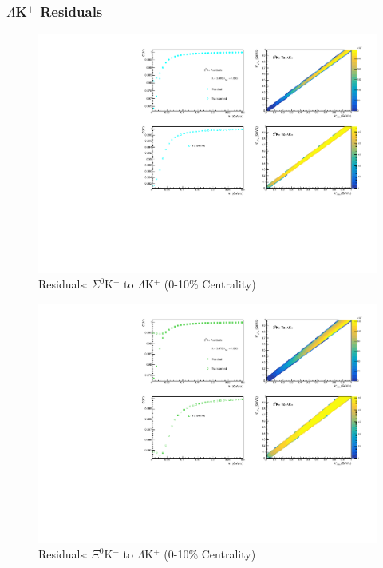 \documentclass[/home/jesse/Analysis/FemtoAnalysis/AnalysisNotes/AnalysisNoteJBuxton.tex]{subfiles}
\begin{document}
\subsubsection{\texorpdfstring{$\Lambda$K$^{+}$}{TEXT} Residuals}
\label{Residuals_LamKchP}

\begin{figure}[h]
  \centering
  \includegraphics[width=\textwidth]{9_AdditionalFigures/Figures/Residuals/LamKchP/Residuals_LamKchP_0010_Sig0KchP_MomResCrctn_NonFlatBgdCrctn_10Res_PrimMaxDecay4fm_UsingXiDataAndCoulombOnly.pdf}
  \caption[Residuals: $\Sigma^{0}$K$^{+}$ to $\Lambda$K$^{+}$ (0-10\% Centrality)]{Residuals: $\Sigma^{0}$K$^{+}$ to $\Lambda$K$^{+}$ (0-10\% Centrality)}
  \label{fig:Res_LamKchP_0010_Sig0KchP}
\end{figure}


\begin{figure}[h]
  \centering
  \includegraphics[width=\textwidth]{9_AdditionalFigures/Figures/Residuals/LamKchP/Residuals_LamKchP_0010_Xi0KchP_MomResCrctn_NonFlatBgdCrctn_10Res_PrimMaxDecay4fm_UsingXiDataAndCoulombOnly.pdf}
  \caption[Residuals: $\Xi^{0}$K$^{+}$ to $\Lambda$K$^{+}$ (0-10\% Centrality)]{Residuals: $\Xi^{0}$K$^{+}$ to $\Lambda$K$^{+}$ (0-10\% Centrality)}
  \label{fig:Res_LamKchP_0010_Xi0KchP}
\end{figure}
\end{document}
